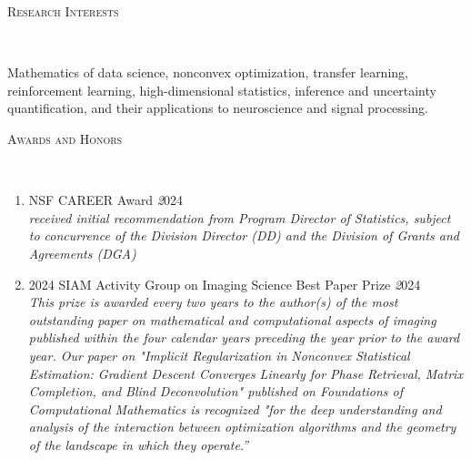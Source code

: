 \documentclass[a4paper, 10pt]{article}
\newenvironment{changemargin}[2]{%
  \begin{list}{}{%
    \setlength{\topsep}{0pt}%
    \setlength{\leftmargin}{#1}%
    \setlength{\rightmargin}{#2}%
    \setlength{\listparindent}{\parindent}%
    \setlength{\itemindent}{\parindent}%
    \setlength{\parsep}{\parskip}%
  }%
  \item[]}{\end{list}
}
\newcommand{\lineover}{
	\begin{changemargin}{-0.05in}{-0.05in}
		\vspace*{-8pt}
		\hrulefill \\
		\vspace*{-2pt}
	\end{changemargin}
}
\newcommand{\header}[1]{
	\begin{changemargin}{-0.5in}{-0.5in}
		\scshape{#1}\\
  	\lineover
	\end{changemargin}
}
\newenvironment{body} {
	\vspace*{-16pt}
	\begin{changemargin}{-0.3in}{-0.5in}
  }	
	{\end{changemargin}
}
\begin{document}
\bigskip
\header{\LARGE{Research Interests}}
\begin{body}
\vspace{18pt}
Mathematics of data science, nonconvex optimization,  transfer learning, reinforcement learning, high-dimensional statistics, inference and uncertainty quantification, and their applications to neuroscience and signal processing.
\end{body}


\bigskip

\header{\LARGE{Awards and Honors}}

\begin{body}
    \vspace{18pt}
    \begin{enumerate}
    \item NSF CAREER Award  \hfill{} \emph 2024 \\
    {\em received initial recommendation from Program Director of Statistics, subject to concurrence of the Division Director (DD) and the Division of Grants and Agreements (DGA) }
    \item 2024 SIAM Activity Group on Imaging Science Best Paper Prize \hfill{} \emph 2024 \\
    	{\em This prize is awarded every two years to the author(s) of the most outstanding paper on mathematical and computational aspects of imaging published within the four calendar years preceding the year prior to the award year. Our paper on "Implicit Regularization in Nonconvex Statistical Estimation: Gradient Descent Converges Linearly for Phase Retrieval, Matrix Completion, and Blind Deconvolution" published on Foundations of Computational Mathematics is recognized "for the deep understanding and analysis of the interaction between optimization algorithms and the geometry of the landscape in which they operate.”} \\
    \smallskip


\end{enumerate}
\end{body}
\end{document}
